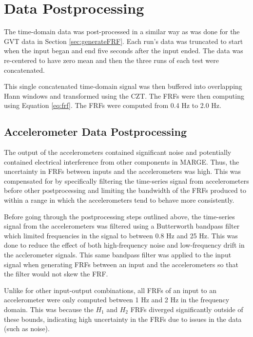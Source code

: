 \section{Data Postprocessing} %

The time-domain data was post-processed in a similar way as was done for the GVT data in Section \ref{sec:generateFRF}. Each run's data was truncated to start when the input began and end five seconds after the input ended. The data was re-centered to have zero mean and then the three runs of each test were concatenated.

This single concatenated time-domain signal was then buffered into overlapping Hann windows and transformed using the CZT. The FRFs were then computing using Equation \ref{eq:frf}. The FRFs were computed from 0.4 Hz to 2.0 Hz.

\subsection{Accelerometer Data Postprocessing} %
\label{sec:accDataPost}

The output of the accelerometers contained significant noise and potentially contained electrical interference from other components in MARGE. Thus, the uncertainty in FRFs between inputs and the accelerometers was high. This was compensated for by specifically filtering the time-series signal from accelerometers before other postprocessing and limiting the bandwidth of the FRFs produced to within a range in which the accelerometers tend to behave more consistently.

Before going through the postprocessing steps outlined above, the time-series signal from the accelerometers was filtered using a Butterworth bandpass filter which limited frequencies in the signal to between 0.8 Hz and 25 Hz. This was done to reduce the effect of both high-frequency noise and low-frequency drift in the acclerometer signals. This same bandpass filter was applied to the input signal when generating FRFs between an input and the accelerometers so that the filter would not skew the FRF.

Unlike for other input-output combinations, all FRFs of an input to an accelerometer were only computed between 1 Hz and 2 Hz in the frequency domain. This was because the $H_1$ and $H_2$ FRFs diverged significantly outside of these bounds, indicating high uncertainty in the FRFs due to issues in the data (such as noise).